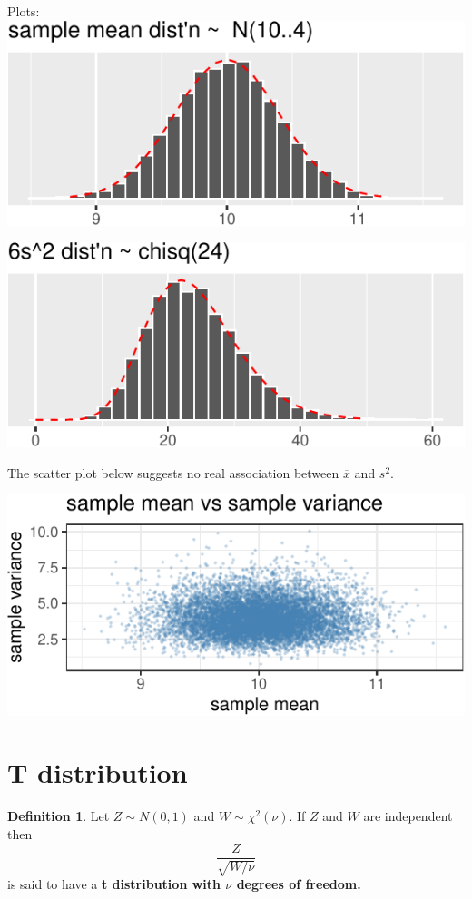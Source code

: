 \documentclass[
]{book}
\theoremstyle{definition}
\newtheorem{definition}{Definition}[chapter]
\theoremstyle{definition}
\theoremstyle{definition}
\theoremstyle{definition}
\theoremstyle{remark}
\begin{document}
Plots:
\includegraphics{math340-notes_files/figure-latex/unnamed-chunk-29-1.pdf}

\includegraphics{math340-notes_files/figure-latex/unnamed-chunk-30-1.pdf}

The scatter plot below suggests no real association between \(\overline{x}\) and \(s^2\).

\includegraphics{math340-notes_files/figure-latex/unnamed-chunk-31-1.pdf}

\section{T distribution}\label{t-distribution}

\begin{definition}
\protect\hypertarget{def:t-distribution}{}\label{def:t-distribution}Let \(Z \sim N(0,1)\) and \(W \sim \chi^2(\nu)\). If \(Z\) and \(W\) are independent then \[\frac{Z}{\sqrt{W/\nu}}\] is said to have a \textbf{t distribution with \(\nu\) degrees of freedom.}
\end{definition}
\end{document}
